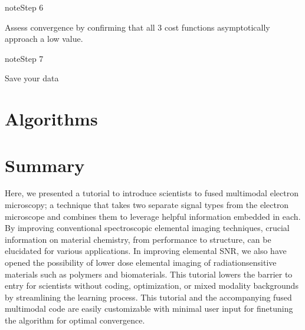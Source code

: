 \documentclass[letterpaper,10pt,english]{jupyterBook}
\begin{document}
\begin{sphinxadmonition}{note}{Step 6}

\sphinxAtStartPar
Assess convergence by confirming that all 3 cost functions asymptotically approach a low value.
\end{sphinxadmonition}

\begin{sphinxadmonition}{note}{Step 7}

\sphinxAtStartPar
Save your data
\end{sphinxadmonition}

\sphinxstepscope


\chapter{Algorithms}
\label{\detokenize{05_algorithms:algorithms}}\label{\detokenize{05_algorithms::doc}}
\sphinxstepscope


\chapter{Summary}
\label{\detokenize{06_conclusion:summary}}\label{\detokenize{06_conclusion:id1}}\label{\detokenize{06_conclusion::doc}}
\sphinxAtStartPar
Here, we presented a tutorial to introduce scientists to fused multi\sphinxhyphen{}modal electron microscopy; a technique that takes two separate signal types from the electron microscope and combines them to leverage helpful information embedded in each. By improving conventional spectroscopic elemental imaging techniques, crucial information on material chemistry, from performance to structure, can be elucidated for various applications. In improving elemental SNR, we also have opened the possibility of lower dose elemental imaging of radiation\sphinxhyphen{}sensitive materials such as polymers and biomaterials.  This tutorial lowers the barrier to entry for scientists without coding, optimization, or mixed modality backgrounds by streamlining the learning process.  This tutorial and the accompanying fused multi\sphinxhyphen{}modal code are easily customizable with minimal user input for fine\sphinxhyphen{}tuning the algorithm for optimal convergence.
\end{document}
